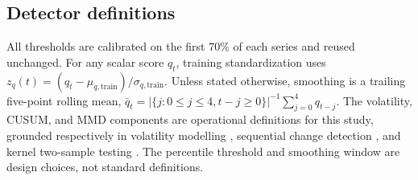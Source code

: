 \documentclass[pdflatex,sn-mathphys-num,iicol]{sn-jnl}
\begin{document}
\subsection{Detector definitions}
All thresholds are calibrated on the first 70\% of each series and reused unchanged. For any scalar score $q_t$, training standardization uses $z_q(t)=(q_t-\mu_{q,\mathrm{train}})/\sigma_{q,\mathrm{train}}$. Unless stated otherwise, smoothing is a trailing five-point rolling mean, $\bar q_t=|\{j:0\leq j\leq4,t-j\geq0\}|^{-1}\sum_{j=0}^{4}q_{t-j}$. The volatility, CUSUM, and MMD components are operational definitions for this study, grounded respectively in volatility modelling \cite{andersen2003,bollerslev1986}, sequential change detection \cite{page1954}, and kernel two-sample testing \cite{gretton2012}. The percentile threshold and smoothing window are design choices, not standard definitions.
\end{document}
